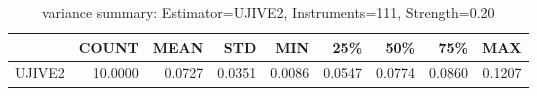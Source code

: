 \begin{table}[ht]
\centering
\caption{variance summary: Estimator=UJIVE2, Instruments=111, Strength=0.20}
\begin{tabular}{lrrrrrrrr}
\toprule
 & COUNT & MEAN & STD & MIN & 25\% & 50\% & 75\% & MAX \\
\midrule
UJIVE2 & 10.0000 & 0.0727 & 0.0351 & 0.0086 & 0.0547 & 0.0774 & 0.0860 & 0.1207 \\
\bottomrule
\end{tabular}
\end{table}
